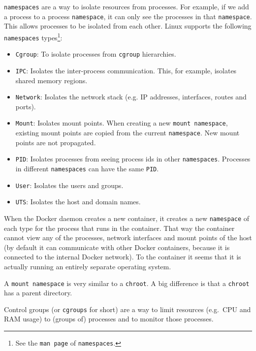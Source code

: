 \lstinline{namespaces} are a way to isolate resources from processes. For example, if we add a process to a process \lstinline{namespace}, it can only see the processes in that \lstinline{namespace}. This allows processes to be isolated from each other. Linux supports the following \lstinline{namespaces} types\footnote{See the \lstinline{man page} of \lstinline{namespaces}.}:
\begin{itemize}
    \item \lstinline{Cgroup}: To isolate processes from \lstinline{cgroup} hierarchies.
    \item \lstinline{IPC}: Isolates the inter-process communication. This, for example, isolates shared memory regions.
    \item \lstinline{Network}: Isolates the network stack (e.g. IP addresses, interfaces, routes and ports).
    \item \lstinline{Mount}: Isolates mount points. When creating a new \lstinline{mount namespace}, existing mount points are copied from the current \lstinline{namespace}. New mount points are not propagated.
    \item \lstinline{PID}: Isolates processes from seeing process ids in other \lstinline{namespaces}. Processes in different \lstinline{namespaces} can have the same \lstinline{PID}.
    \item \lstinline{User}: Isolates the users and groups.
    \item \lstinline{UTS}: Isolates the host and domain names.
\end{itemize}

When the Docker daemon creates a new container, it creates a new \lstinline{namespace} of each type for the process that runs in the container. That way the container cannot view any of the processes, network interfaces and mount points of the host (by default it can communicate with other Docker containers, because it is connected to the internal Docker network). To the container it seems that it is actually running an entirely separate operating system.

A \lstinline{mount namespace} is very similar to a \lstinline{chroot}. A big difference is that a \lstinline{chroot} has a parent directory.

\hfill

Control groups (or \lstinline{cgroups} for short) are a way to limit resources (e.g.\ CPU and RAM usage) to (groups of) processes and to monitor those processes.

\hfill

